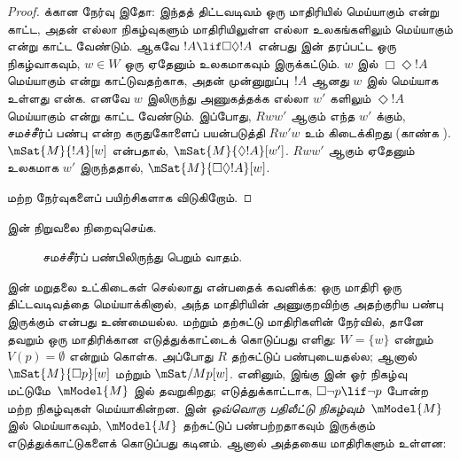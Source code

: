 \documentclass[../../../include/open-logic-section]{subfiles}
\begin{document}
\begin{proof}
   க்கான நேர்வு இதோ: இந்தத் திட்டவடிவம் ஒரு மாதிரியில் மெய்யாகும்
  என்று காட்ட, அதன் எல்லா நிகழ்வுகளும் மாதிரியிலுள்ள எல்லா உலகங்களிலும்
  மெய்யாகும் என்று காட்ட வேண்டும். ஆகவே $!A \lif \Box\Diamond !A$ என்பது
   இன் தரப்பட்ட ஒரு நிகழ்வாகவும், $w \in W$ ஒரு ஏதேனும் உலகமாகவும்
  இருக்கட்டும். $w$ இல் $\Box \Diamond !A$ மெய்யாகும் என்று காட்டுவதற்காக,
  அதன் முன்னுறுப்பு~$!A$ ஆனது $w$ இல் மெய்யாக உள்ளது என்க. எனவே $w$
  இலிருந்து அணுகத்தக்க எல்லா $w'$ களிலும் $\Diamond !A$ மெய்யாகும் என்று
  காட்ட வேண்டும். இப்போது, $Rww'$ ஆகும் எந்த $w'$ க்கும், சமச்சீர்ப் பண்பு
  என்ற கருதுகோளைப் பயன்படுத்தி $Rw'w$ உம் கிடைக்கிறது (காண்க
  ). $\mSat{M}{!A}[w]$ என்பதால்,
  $\mSat{M}{\Diamond !A}[w']$. $Rww'$ ஆகும் ஏதேனும் உலகமாக $w'$ இருந்ததால்,
  $\mSat{M}{\Box\Diamond!A}[w]$.

  மற்ற நேர்வுகளைப் பயிற்சிகளாக விடுகிறோம்.
\end{proof}

\begin{prob}
   இன் நிறுவலை நிறைவுசெய்க.
\end{prob}

\begin{figure}
  \begin{center}
  \end{center}
\caption{சமச்சீர்ப் பண்பிலிருந்து பெறும் வாதம்.}
\end{figure}

 இன் மறுதலை உட்கிடைகள் செல்லாது என்பதைக்
கவனிக்க: ஒரு மாதிரி ஒரு திட்டவடிவத்தை மெய்யாக்கினால், அந்த மாதிரியின்
அணுகுறவிற்கு அதற்குரிய பண்பு இருக்கும் என்பது உண்மையல்ல.  மற்றும்
தற்சுட்டு மாதிரிகளின் நேர்வில்,  தானே தவறும் ஒரு மாதிரிக்கான
எடுத்துக்காட்டைக் கொடுப்பது எளிது: $W = \{w\}$ என்றும் $V(p) = \emptyset$
என்றும் கொள்க. அப்போது $R$ தற்சுட்டுப் பண்புடையதல்ல; ஆனால்
$\mSat{M}{\Box p}[w]$ மற்றும் $\mSat/{M}{p}[w]$. எனினும், இங்கு
 இன் ஓர் நிகழ்வு மட்டுமே~$\mModel{M}$ இல் தவறுகிறது; எடுத்துக்காட்டாக,
$\Box \lnot p \lif \lnot p$ போன்ற மற்ற நிகழ்வுகள் மெய்யாகின்றன.
 இன் \emph{ஒவ்வொரு பதிலீட்டு நிகழ்வும்}~$\mModel{M}$ இல் மெய்யாகவும்,
$\mModel{M}$ தற்சுட்டுப் பண்பற்றதாகவும் இருக்கும் எடுத்துக்காட்டுகளைக்
கொடுப்பது கடினம். ஆனால் அத்தகைய மாதிரிகளும் உள்ளன:
\end{document}
